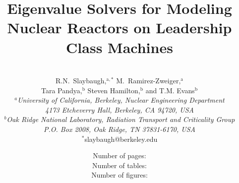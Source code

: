 \documentclass{article}                                                                           %
\begin{document}

\title{Eigenvalue Solvers for Modeling Nuclear Reactors on Leadership Class Machines} %

\author{
\vspace{20mm}
\\R.N.\ Slaybaugh,$^{\text{a},\ast}$ M.\ Ramirez-Zweiger,$^{\text{a}}$ \\Tara Pandya,$^\text{b}$ Steven Hamilton,$^\text{b}$ and T.M. Evans$^\text{b}$\\[4pt] %
\textit{$^a$University of California, Berkeley, Nuclear Engineering Department}\\[-10pt]       %
\textit{4173 Etcheverry Hall, Berkeley, CA 94720, USA} \\[-5pt]
\textit{$^b$Oak Ridge National Laboratory, Radiation Transport and Criticality Group} \\ [-10pt]
\textit{P.O. Box 2008, Oak Ridge, TN 37831-6170, USA} \\ [-2pt]
{$^\ast$slaybaugh@berkeley.edu}}       %

\date{                               %
\vspace{40mm}
Number of pages: \pageref{LastPage} \\  
Number of tables: \totaltables \\
Number of figures: \totalfigures \\}                                                                                           

\maketitle

\pagebreak
\end{document}
